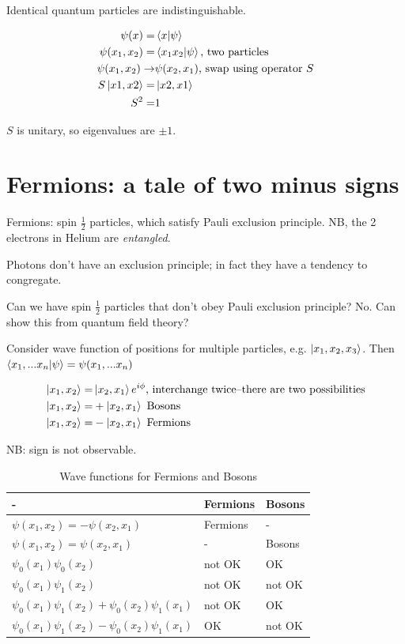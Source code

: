 \documentclass[]{article}
\begin{document}
Identical quantum particles are indistinguishable.

\begin{align*}
\psi(x) =& \braket{x|\psi}\\
\psi(x_1,x_2) =& \braket{x_1x_2|\psi}\text{, two particles}\\
\psi(x_1,x_2) \rightarrow & \psi(x_2,x_1)\text{, swap using operator $S$}\\
S\ket{x1,x2} =& \ket{x2,x1}\\
S^2 =& 1
\end{align*}

$S$ is unitary, so eigenvalues are $\pm1$.

\section{Fermions: a tale of two minus signs}

Fermions: spin $\frac{1}{2}$ particles, which satisfy Pauli exclusion principle. NB, the 2 electrons in Helium are \textit{entangled}.

Photons don't have an exclusion principle; in fact they have a tendency to congregate.
 
Can we have spin $\frac{1}{2}$ particles that don't obey Pauli exclusion principle? No. Can show this from quantum field theory?

Consider wave function of positions for multiple particles, e.g. $\ket{x_1,x_2,x_3}$. Then $\braket{x_1,...x_n|\psi}=\psi(x_1,...x_n)$

\begin{align*}
\ket{x_1, x_2}=&\ket{x_2, x_1}e^{i\phi}\text{, interchange twice--there are two possibilities}\\
\ket{x_1, x_2}=&+\ket{x_2, x_1}\text{ Bosons}\\
\ket{x_1, x_2}=&-\ket{x_2, x_1}\text{ Fermions}
\end{align*}

NB: sign is not observable.

\begin{table}[H]
	\begin{center}
		\caption{Wave functions for Fermions and Bosons}
			\begin{tabular}{|l| l| l|} \hline 
				-&Fermions&Bosons \\ \hline 
				$\psi(x_1,x_2)=-\psi(x_2,x_1)$&Fermions&-\\ \hline
				$\psi(x_1,x_2)=\psi(x_2,x_1)$&-& Bosons\\ \hline
				$\psi_0(x_1)\psi_0(x_2)$&not OK& OK\\ \hline
				$\psi_0(x_1)\psi_1(x_2)$&not OK& not OK\\ \hline
				$\psi_0(x_1)\psi_1(x_2)+\psi_0(x_2)\psi_1(x_1)$&not OK& OK\\ \hline
				$\psi_0(x_1)\psi_1(x_2)-\psi_0(x_2)\psi_1(x_1)$&OK&not OK \\ \hline
			\hline
		\end{tabular}
	\end{center}
\end{table}
\end{document}
